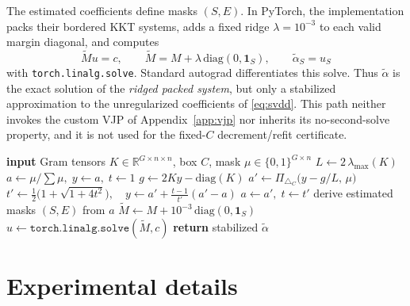 The estimated coefficients define masks $(S,E)$. In PyTorch, the implementation packs
their bordered KKT systems, adds a fixed ridge $\lambda=10^{-3}$ to each valid margin
diagonal, and computes
\begin{equation}
\widetilde{M}u=c,\qquad
\widetilde{M}=M+\lambda\,\mathrm{diag}(0,\mathbf{1}_S),
\qquad \widetilde{\alpha}_S=u_S
\end{equation}
with \texttt{torch.linalg.solve}. Standard autograd differentiates this solve. Thus
$\widetilde{\alpha}$ is the exact solution of the \emph{ridged packed system}, but only
a stabilized approximation to the unregularized coefficients of \eqref{eq:svdd}. This
path neither invokes the custom VJP of Appendix~\ref{app:vjp} nor inherits its
no-second-solve property, and it is not used for the fixed-$C$
decrement/refit certificate.

\begin{algorithm}[h]
\caption{Stabilized batched SVDD training approximation (one FISTA step shown; all
problems in parallel).}
\label{alg:fista}
\begin{algorithmic}[1]
\State \textbf{input} Gram tensors $K \in \mathbb{R}^{G \times n \times n}$, box $C$, mask
$\mu \in \{0,1\}^{G \times n}$
\State $L \gets 2\,\lambda_{\max}(K)$ 
\State $a \gets \mu / \!\sum \mu,\; y \gets a,\; t \gets 1$
  \State $g \gets 2 K y - \mathrm{diag}(K)$ 
  \State $a' \gets \Pi_{\triangle_C}\!\big(y - g / L,\, \mu\big)$ 
  \State $t' \gets \tfrac{1}{2}\big(1 + \sqrt{1 + 4 t^2}\big),\quad
         y \gets a' + \tfrac{t - 1}{t'}(a' - a)$
  \State $a \gets a',\; t \gets t'$
\EndFor
\State derive estimated masks $(S,E)$ from $a$
\State $\widetilde M \gets M + 10^{-3}\,\mathrm{diag}(0,\mathbf{1}_S)$
\State $u \gets \texttt{torch.linalg.solve}(\widetilde M,c)$
\State \textbf{return} stabilized $\widetilde{\alpha}$
\end{algorithmic}
\end{algorithm}

\section{Experimental details}\label{app:details}
